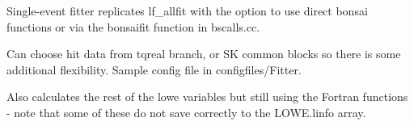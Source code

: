 Single-\/event fitter replicates lf\+\_\+allfit with the option to use direct bonsai functions or via the bonsaifit function in bscalls.\+cc.

Can choose hit data from tqreal branch, or SK common blocks so there is some additional flexibility. Sample config file in configfiles/\+Fitter.

Also calculates the rest of the lowe variables but still using the Fortran functions -\/ note that some of these do not save correctly to the LOWE.\+linfo array. 